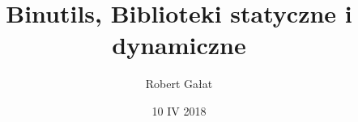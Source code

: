 \usepackage{cite}
\usepackage{polski}
\usepackage[utf8]{inputenc}
\usepackage{array}
\usepackage{hyperref}
\usepackage{graphicx}
\usepackage{listings}

\date{10 IV 2018}

\title{Binutils, Biblioteki statyczne i dynamiczne }
\author{Robert Gałat}

